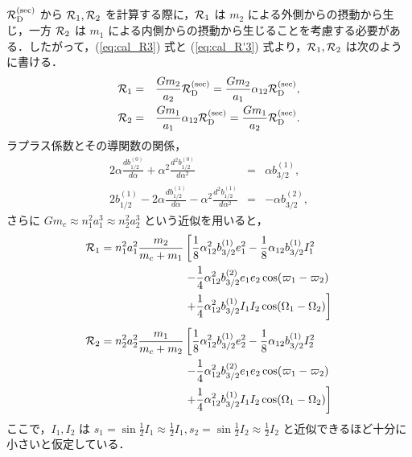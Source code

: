\documentclass[11pt,a4paper,oneside,onecolumn]{jreport}
\begin{document}
${\cal R}_{\rm D}^{\rm (sec)}$ から ${\cal R}_1, {\cal R}_2$ を計算する際に，${\cal R}_1$ は $m_2$ による外側からの摂動から生じ，一方 ${\cal R}_2$ は $m_1$ による内側からの摂動から生じることを考慮する必要がある．したがって，(\ref{eq:cal_R3}) 式と (\ref{eq:cal_R'3}) 式より，${\cal R}_1, {\cal R}_2$ は次のように書ける．
\begin{eqnarray}
{\cal R}_1 & = & \frac{G m_2}{a_2} {\cal R}_{\rm D}^{\rm (sec)} = \frac{G m_2}{a_1} \alpha_{12} {\cal R}_{\rm D}^{\rm (sec)}, \\ \label{}
{\cal R}_2 & = & \frac{G m_1}{a_1} \alpha_{12} {\cal R}_{\rm D}^{\rm (sec)} = \frac{G m_1}{a_2} {\cal R}_{\rm D}^{\rm (sec)}. \label{}
\end{eqnarray}
ラプラス係数とその導関数の関係，
\begin{eqnarray}
2 \alpha \frac{d b_{1/2}^{(0)}}{d \alpha} + \alpha^2 \frac{d^2 b_{1/2}^{(0)}}{d \alpha^2} & = & \alpha b_{3/2}^{(1)}, \\ \label{}
2 b_{1/2}^{(1)} - 2 \alpha \frac{d b_{1/2}^{(1)}}{d \alpha} - \alpha^2 \frac{d^2 b_{1/2}^{(1)}}{d \alpha^2} & = & - \alpha b_{3/2}^{(2)}, \label{}
\end{eqnarray}
さらに $G m_c \approx n_1^2 a_1^3 \approx n_2^2 a_2^3$ という近似を用いると，
\begin{equation}
\begin{split}
{\cal R}_1 = n_1^2 a_1^2 \frac{m_2}{m_c + m_1} & \left[ \frac{1}{8} \alpha_{12}^2 b_{3/2}^{(1)} e_1^2 - \frac{1}{8} \alpha_{12} b_{3/2}^{(1)} I_1^2 \right. \\
& \left. - \frac{1}{4} \alpha_{12}^2 b_{3/2}^{(2)} e_1 e_2 \cos (\varpi_1 - \varpi_2) \right. \\
& \left. + \frac{1}{4} \alpha_{12}^2 b_{3/2}^{(1)} I_1 I_2 \cos (\Omega_1 - \Omega_2) \right] \\
\end{split} \label{}
\end{equation}
\begin{equation}
\begin{split}
{\cal R}_2 = n_2^2 a_2^2 \frac{m_1}{m_c + m_2} & \left[ \frac{1}{8} \alpha_{12}^2 b_{3/2}^{(1)} e_2^2 - \frac{1}{8} \alpha_{12} b_{3/2}^{(1)} I_2^2 \right. \\
& \left. - \frac{1}{4} \alpha_{12}^2 b_{3/2}^{(2)} e_1 e_2 \cos (\varpi_1 - \varpi_2) \right. \\
& \left. + \frac{1}{4} \alpha_{12}^2 b_{3/2}^{(1)} I_1 I_2 \cos (\Omega_1 - \Omega_2) \right] \\
\end{split} \label{}
\end{equation}
ここで，$I_1, I_2$ は $s_1 = \sin \frac{1}{2} I_1 \approx \frac{1}{2} I_1, s_2 = \sin \frac{1}{2} I_2 \approx \frac{1}{2} I_2$ と近似できるほど十分に小さいと仮定している．
\end{document}
